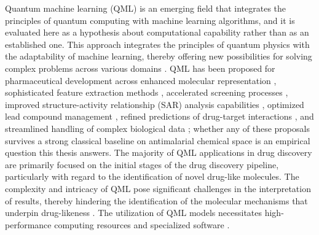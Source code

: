 Quantum machine learning (QML) is an emerging field that integrates the principles of quantum computing with machine learning algorithms, and it is evaluated here as a hypothesis about computational capability rather than as an established one. This approach integrates the principles of quantum physics with the adaptability of machine learning, thereby offering new possibilities for solving complex problems across various domains \cite{Suzuki2020,Mensa2023}. QML has been proposed for pharmaceutical development across enhanced molecular representation \cite{Roy2023,McKinseyCompany2023}, sophisticated feature extraction methods \cite{Huang2021}, accelerated screening processes \cite{Biamonte2017}, improved structure-activity relationship (SAR) analysis capabilities \cite{Cao2019}, optimized lead compound management \cite{Outeiral2020}, refined predictions of drug-target interactions \cite{Smaldone2024}, and streamlined handling of complex biological data \cite{PerdomoOrtiz2017,Cerezo2020}; whether any of these proposals survives a strong classical baseline on antimalarial chemical space is an empirical question this thesis answers. The majority of QML applications in drug discovery are primarily focused on the initial stages of the drug discovery pipeline, particularly with regard to the identification of novel drug-like molecules. The complexity and intricacy of QML pose significant challenges in the interpretation of results, thereby hindering the identification of the molecular mechanisms that underpin drug-likeness \cite{Bova2021}. The utilization of QML models necessitates high-performance computing resources and specialized software \cite{Cerezo2023,Britt2015}.

